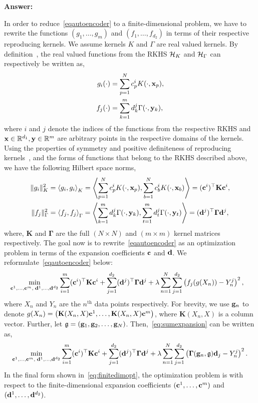 {\bf Answer:}

In order to reduce~\eqref{eqautoencoder} to a finite-dimensional problem, we have to rewrite the functions $(g_1,\dots,g_m)$ and $(f_1,\dots,f_{d_2})$ in terms of their respective reproducing kernels. We assume kernels $K$ and $\Gamma$ are real valued kernels. By definition~\citep[Chapter 2.3]{fasshauer2015kernel}, the real valued functions from the RKHS $\mathcal{H}_K$ and $\mathcal{H}_\Gamma$ can respectively be written as,
\begin{align}
g_i(\cdot) &= \sum\limits_{p=1}^{N} c^i_p K(\cdot, \mathbf{x}_p), \\
f_j(\cdot) &= \sum\limits_{k=1}^{m} d^j_k \Gamma(\cdot, \mathbf{y}_k),
\end{align}
where $i$ and $j$ denote the indices of the functions from the respective RKHS and ${\mathbf{x} \in \mathbb{R}^{d_1}, \mathbf{y} \in \mathbb{R}^m}$ are arbitrary points in the respective domains of the kernels. Using the properties of symmetry and positive definiteness of reproducing kernels~\citep[Chapter 2.3]{fasshauer2015kernel}, and the forms of functions that belong to the RKHS described above, we have the following Hilbert space norms,
\begin{align}
\|g_i\|_K^2 &= \left\langle g_i, g_i \right\rangle_K = \left\langle \sum\limits_{p=1}^{N} c^i_p K(\cdot, \mathbf{x}_p), \sum\limits_{b=1}^{N} c^i_b K(\cdot, \mathbf{x}_b) \right\rangle =  (\mathbf{c}^i)^\top \mathbf{K} \mathbf{c}^i, \\
\|f_j\|_\Gamma^2 &= \left\langle f_j, f_j \right\rangle_{\Gamma} = \left\langle \sum\limits_{k=1}^{m} d^j_k \Gamma(\cdot, \mathbf{y}_k), \sum\limits_{t=1}^{m} d^j_t \Gamma(\cdot, \mathbf{y}_t) \right\rangle =  (\mathbf{d}^j)^\top \mathbf{\Gamma} \mathbf{d}^j,
\end{align}
where, $\mathbf{K}$ and $\mathbf{\Gamma}$ are the full $(N\times N)$ and $(m\times m)$ kernel matrices respectively. The goal now is to rewrite~\eqref{eqautoencoder} as an optimization problem in terms of the expansion coefficients $\mathbf{c}$ and $\mathbf{d}$. We reformulate~\eqref{eqautoencoder} below:
\begin{align}
&\min_{\mathbf{c}^1,\ldots,\mathbf{c}^m,\; \mathbf{d}^1,\ldots,\mathbf{d}^{d_2}} 
\sum_{i=1}^m (\mathbf{c}^i)^\top \mathbf{K} \mathbf{c}^i
+ \sum_{j=1}^{d_2} (\mathbf{d}^j)^\top \mathbf{\Gamma} \mathbf{d}^j
+ \lambda \sum\limits_{n=1}^N \sum\limits_{j=1}^{d_2} \left( f_j(g(X_n)) - Y^j_n \right)^2, \label{eq:sumexpansion}
\end{align}
where $X_n$ and $Y_n$ are the $n^{\text{th}}$ data points respectively. For brevity, we use $\mathbf{g}_n$ to denote $g(X_n) = \left(\mathbf{K}(X_n, X) \mathbf{c}^1, \dots, \mathbf{K}(X_n, X) \mathbf{c}^m \right)$, where $\mathbf{K}(X_n, X)$ is a column vector. Further, let $\mathfrak{g} = (\mathbf{g}_1, \mathbf{g}_2, \dots, \mathbf{g}_N)$. Then,~\eqref{eq:sumexpansion} can be written as,
\begin{align}
\min_{\mathbf{c}^1,\ldots,\mathbf{c}^m,\; \mathbf{d}^1,\ldots,\mathbf{d}^{d_2}} 
\sum_{i=1}^m (\mathbf{c}^i)^\top \mathbf{K} \mathbf{c}^i
+ \sum_{j=1}^{d_2} (\mathbf{d}^j)^\top \mathbf{\Gamma} \mathbf{d}^j
+ \lambda \sum\limits_{n=1}^N \sum\limits_{j=1}^{d_2} \left( \mathbf{\Gamma}(\mathbf{g}_n, \mathfrak{g}) \mathbf{d}_j - Y^j_n \right)^2. \label{eq:finitedimopt}
\end{align}
In the final form shown in~\eqref{eq:finitedimopt}, the optimization problem is with respect to the finite-dimensional expansion coefficients $(\mathbf{c}^1, \dots, \mathbf{c}^m)$ and $(\mathbf{d}^1, \dots, \mathbf{d}^{d_2})$.
%
\pagebreak

